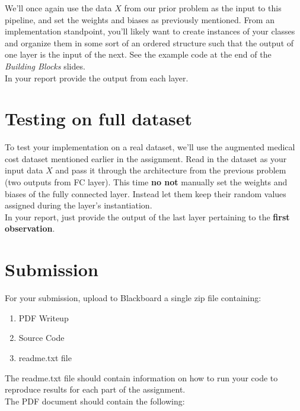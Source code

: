\documentclass[12pt]{article}
\begin{document}
\noindent
We'll once again use the data $X$ from our prior problem as the input to this pipeline, and set the weights and biases as previously mentioned.  From an implementation standpoint, you'll likely want to create instances of your classes and organize them in some sort of an ordered structure such that the output of one layer is the input of the next.  See the example code at the end of the \emph{Building Blocks} slides.\\

\noindent  
 In your report provide the output from each layer.

\newpage
\section{Testing on full dataset}
To test your implementation on a real dataset, we'll use the augmented medical cost dataset mentioned earlier in the assignment.  Read in the dataset as your input data $X$ and pass it through the architecture from the previous problem (two outputs from FC layer).  This time \textbf{no not} manually set the weights and biases of the fully connected layer.  Instead let them keep their random values assigned during the layer's instantiation.\\

\noindent
In your report, just provide the output of the last layer pertaining to the \textbf{first observation}.

\newpage
\section*{Submission}
For your submission, upload to Blackboard a single zip file containing:

\begin{enumerate}
\item PDF Writeup
\item Source Code
\item readme.txt file
\end{enumerate}

\noindent
The readme.txt file should contain information on how to run your code to reproduce results for each part of the assignment.\\

\noindent
The PDF document should contain the following:
\end{document}
